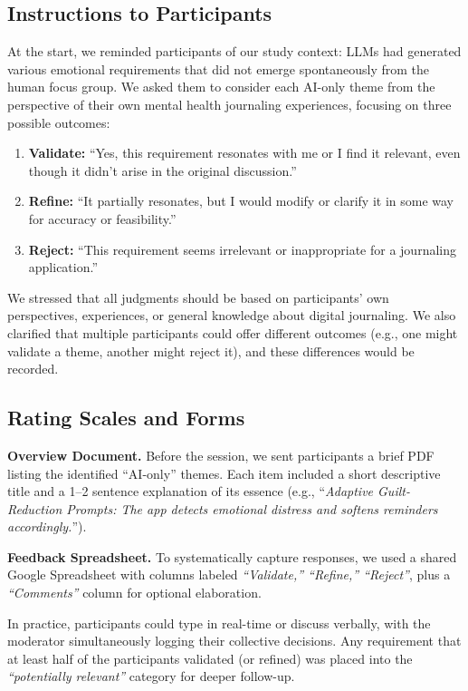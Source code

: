 \documentclass[acmsmall]{acmart}
\begin{document}
\subsection{Instructions to Participants}

At the start, we reminded participants of our study context: LLMs had generated various emotional requirements that did not emerge spontaneously from the human focus group. We asked them to consider each AI-only theme from the perspective of their own mental health journaling experiences, focusing on three possible outcomes:

\begin{enumerate}
    \item \textbf{Validate:} 
    “Yes, this requirement resonates with me or I find it relevant, even though it didn’t arise in the original discussion.”
    \item \textbf{Refine:} 
    “It partially resonates, but I would modify or clarify it in some way for accuracy or feasibility.”
    \item \textbf{Reject:} 
    “This requirement seems irrelevant or inappropriate for a journaling application.”
\end{enumerate}

We stressed that all judgments should be based on participants’ own perspectives, experiences, or general knowledge about digital journaling. We also clarified that multiple participants could offer different outcomes (e.g., one might validate a theme, another might reject it), and these differences would be recorded.

\subsection{Rating Scales and Forms}

\textbf{Overview Document.} Before the session, we sent participants a brief PDF listing the identified “AI-only” themes. Each item included a short descriptive title and a 1--2 sentence explanation of its essence (e.g., “\emph{Adaptive Guilt-Reduction Prompts: The app detects emotional distress and softens reminders accordingly.}”).

\textbf{Feedback Spreadsheet.} To systematically capture responses, we used a shared Google Spreadsheet with columns labeled \emph{“Validate,” “Refine,” “Reject”}, plus a \emph{“Comments”} column for optional elaboration. 

\noindent
In practice, participants could type in real-time or discuss verbally, with the moderator simultaneously logging their collective decisions. Any requirement that at least half of the participants validated (or refined) was placed into the \emph{“potentially relevant”} category for deeper follow-up.
\end{document}
